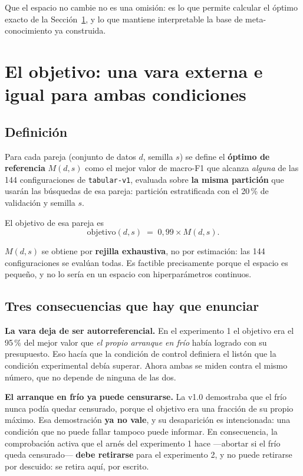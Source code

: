 \documentclass[11pt,letterpaper]{article}
\begin{document}
Que el espacio no cambie no es una omisión: es lo que permite calcular el óptimo
exacto de la Sección~\ref{sec:objetivo}, y lo que mantiene interpretable la base de
meta-conocimiento ya construida.

\section{El objetivo: una vara externa e igual para ambas condiciones}
\label{sec:objetivo}

\subsection{Definición}

Para cada pareja (conjunto de datos $d$, semilla $s$) se define el \textbf{óptimo de
referencia} $M(d,s)$ como el mejor valor de macro-F1 que alcanza \emph{alguna} de las
144 configuraciones de \texttt{tabular-v1}, evaluada sobre \textbf{la misma
partición} que usarán las búsquedas de esa pareja: partición estratificada con el
20\,\% de validación y semilla $s$.

El objetivo de esa pareja es
\[
  \mathrm{objetivo}(d,s) \;=\; 0{,}99 \times M(d,s).
\]

$M(d,s)$ se obtiene por \textbf{rejilla exhaustiva}, no por estimación: las 144
configuraciones se evalúan todas. Es factible precisamente porque el espacio es
pequeño, y no lo sería en un espacio con hiperparámetros continuos.

\subsection{Tres consecuencias que hay que enunciar}

\textbf{La vara deja de ser autorreferencial.} En el experimento 1 el objetivo era el
95\,\% del mejor valor que \emph{el propio arranque en frío} había logrado con su
presupuesto. Eso hacía que la condición de control definiera el listón que la
condición experimental debía superar. Ahora ambas se miden contra el mismo número,
que no depende de ninguna de las dos.

\textbf{El arranque en frío ya puede censurarse.} La v1.0 demostraba que el frío
nunca podía quedar censurado, porque el objetivo era una fracción de su propio
máximo. Esa demostración \textbf{ya no vale}, y su desaparición es intencionada: una
condición que no puede fallar tampoco puede informar. En consecuencia, la
comprobación activa que el arnés del experimento 1 hace ---abortar si el frío queda
censurado--- \textbf{debe retirarse} para el experimento 2, y no puede retirarse por
descuido: se retira aquí, por escrito.
\end{document}
